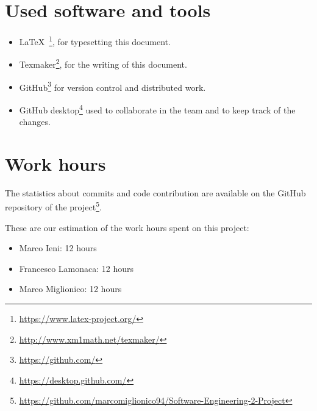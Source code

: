 \section{Used software and tools}
\begin{itemize}
    \item \LaTeX\ \footnote{\url{https://www.latex-project.org/}}, for typesetting this document.
    \item Texmaker\footnote{\url{http://www.xm1math.net/texmaker/}}, for the writing of this document.
    \item GitHub\footnote{\url{https://github.com/}} for version control and distributed work.
   \item GitHub desktop\footnote{\url{https://desktop.github.com/}} used to collaborate in the team and to keep track of the changes. 
\end{itemize}

\section{Work hours}
The statistics about commits and code contribution are available on the GitHub repository of the project\footnote{\url{https://github.com/marcomiglionico94/Software-Engineering-2-Project}}.

These are our estimation of the work hours spent on this project:
\begin{itemize}
    \item Marco Ieni: 12 hours
    \item Francesco Lamonaca: 12 hours
    \item Marco Miglionico: 12 hours
\end{itemize}
